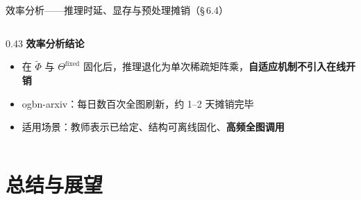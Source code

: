 \documentclass[aspectratio=169,9pt,xcolor=dvipsnames]{beamer}
\begin{document}
\begin{frame}{效率分析——推理时延、显存与预处理摊销（§\,6.4）}
\begin{columns}[T]
\begin{column}{0.43\textwidth}
      \vspace{0.1cm}
      \textbf{效率分析结论}
      \begin{itemize}
        \item 在 $\tilde{\Phi}$ 与 $\Theta^{\mathrm{fixed}}$ 固化后，推理退化为单次稀疏矩阵乘，\textbf{自适应机制不引入在线开销}
        \item ogbn-arxiv：每日数百次全图刷新，约 1--2 天摊销完毕
        \item 适用场景：教师表示已给定、结构可离线固化、\textbf{高频全图调用}
      \end{itemize}
    \end{column}
  \end{columns}
\end{frame}

\section{总结与展望}
\end{document}
